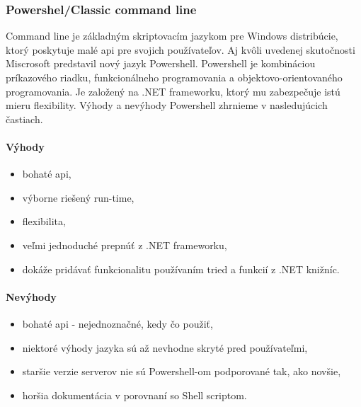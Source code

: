 \subsubsection{Powershel/Classic command line}
\indent  
Command line je základným skriptovacím jazykom pre Windows distribúcie, ktorý poskytuje malé \acrshort{api} pre svojich používateľov. Aj kvôli uvedenej skutočnosti Miscrosoft predstavil nový jazyk Powershell. Powershell je kombináciou príkazového riadku, funkcionálneho programovania a objektovo-orientovaného programovania. Je založený na .NET frameworku, ktorý mu zabezpečuje istú mieru flexibility. 
Výhody a nevýhody Powershell zhrnieme v nasledujúcich častiach.

\paragraph{Výhody}
\begin{itemize}
	\item bohaté \acrshort{api},
	\item výborne riešený run-time,
	\item flexibilita,
	\item veľmi jednoduché prepnúť z .NET frameworku,
	\item dokáže pridávať funkcionalitu používaním tried a funkcií z .NET knižníc.
	\newline 
\end{itemize}
\paragraph{Nevýhody}
\begin{itemize}
	\item bohaté \acrshort{api} - nejednoznačné, kedy čo použiť,
	\item niektoré výhody jazyka sú až nevhodne skryté pred používateľmi,
	\item staršie verzie serverov nie sú Powershell-om podporované tak, ako novšie,
	\item horšia dokumentácia v porovnaní so Shell scriptom.
	\newline
\end{itemize}

